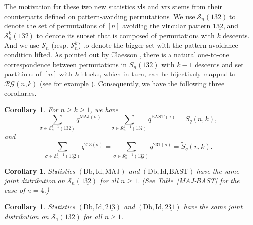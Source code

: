\documentclass[12pt]{amsart}
\numberwithin{equation}{section}
\theoremstyle{plain}
\newtheorem{corollary}[theorem]{Corollary}
\theoremstyle{definition}
\def\MAJ{\mathrm{MAJ}}
\def\BAST{\mathrm{BAST}}
\def\wrs{\mathrm{vrs}}
\def\wls{\mathrm{vls}}
\def\Db{\mathrm{Db}}
\def\Id{\mathrm{Id}}
\def\SS{\mathcal{S}}
\def\RG{\mathcal{RG}}
\begin{document}
The motivation for these two new statistics $\wls$ and $\wrs$ stems from their counterparts defined on pattern-avoiding permutations. We use $\SS_n(1\underline{32})$ to denote the set of permutations of $[n]$ avoiding the vincular pattern $1\underline{32}$, and $\SS_n^k(1\underline{32})$ to denote its subset that is composed of permutations with $k$ descents. And we use $\SS_n$ (resp. $\SS_n^k$) to denote the bigger set with the pattern avoidance condition lifted. As pointed out by Claesson \cite[Proposition~3]{Cl}, there is a natural one-to-one correspondence between permutations in $S_n(1\underline{32})$ with $k-1$ descents and set partitions of $[n]$ with $k$ blocks, which in turn, can be bijectively mapped to $\RG(n,k)$ (see for example \cite[Theorem~5.1]{SW}). Consequently, we have the following three corollaries.
\begin{corollary}\label{main-Sn}
For $n \geq k \geq 1$, we have
\begin{equation*}
  \sum\limits_{\sigma \in \SS_n^{k-1}(1\underline{32})}
    q^{\MAJ(\sigma)}
=
\sum\limits_{\sigma \in \SS_n^{k-1}(1\underline{32})}
    q^{\BAST(\sigma)}=S_q(n,k),
\end{equation*}
and
\begin{equation*}
   \sum\limits_{\sigma \in \SS_n^{k-1}(1\underline{32})}
q^{2\underline{13}(\sigma)}
=
\sum\limits_{\sigma \in \SS_n^{k-1}(1\underline{32})}
q^{2\underline{31}(\sigma)}=\widetilde{S}_q(n,k).
\end{equation*}
\end{corollary}

\begin{corollary}\label{main-bijectionper}
Statistics $(\Db, \Id, \MAJ)$ and
$(\Db, \Id, \BAST)$ have the same joint distribution on $\SS_n(1\underline{32})$ for all $n \geq 1$. (See Table~\ref{MAJ-BAST} for the case of $n=4$.)
\end{corollary}

\begin{corollary}\label{main-bijectionper-r}
Statistics $(\Db, \Id, 2\underline{13})$ and
$(\Db, \Id, 2\underline{31})$ have the same joint distribution on $\SS_n(1\underline{32})$ for all $n\geq 1$.
\end{corollary}
\end{document}
